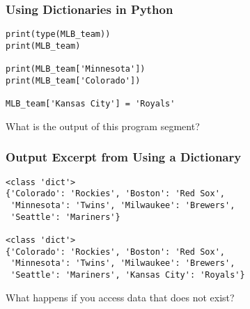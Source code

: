 \documentclass[14pt,aspectratio=169]{beamer}
\begin{document}
%
\begin{frame}[fragile]
  \frametitle{Using Dictionaries in Python}
  \hspace*{.1in}
  \begin{minipage}{6in}
    \vspace*{.25in}
    \begin{verbatim}
print(type(MLB_team))
print(MLB_team)

print(MLB_team['Minnesota'])
print(MLB_team['Colorado'])

MLB_team['Kansas City'] = 'Royals'
    \end{verbatim}
  \end{minipage}
  \vspace*{.025in}
  \begin{center}
    \normalsize \noindent What is the output of this program segment? \\
  \end{center}
\end{frame}

%
\begin{frame}[fragile]
  \frametitle{Output Excerpt from Using a Dictionary}
  \begin{minipage}{6in}
    \vspace*{.25in}
    \begin{verbatim}
<class 'dict'>
{'Colorado': 'Rockies', 'Boston': 'Red Sox',
 'Minnesota': 'Twins', 'Milwaukee': 'Brewers',
 'Seattle': 'Mariners'}

<class 'dict'>
{'Colorado': 'Rockies', 'Boston': 'Red Sox',
 'Minnesota': 'Twins', 'Milwaukee': 'Brewers',
 'Seattle': 'Mariners', 'Kansas City': 'Royals'}
    \end{verbatim}
  \end{minipage}
  \vspace*{.025in}
  \begin{center}
    \normalsize \noindent What happens if you access data that does not exist? \\
  \end{center}
\end{frame}
\end{document}
